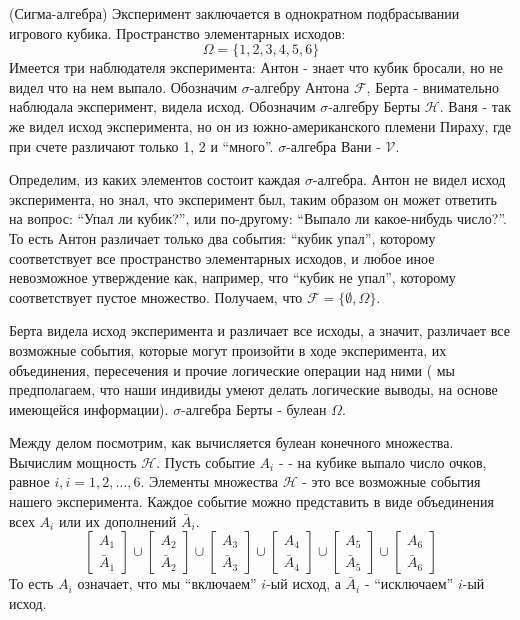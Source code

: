 \begin{exmp}(Сигма-алгебра)
	Эксперимент заключается в однократном подбрасывании игрового кубика. Пространство элементарных исходов:
	\[ \Omega = \{ 1, 2, 3, 4, 5, 6 \} \]
	Имеется три наблюдателя эксперимента: Антон - знает что кубик бросали, но не видел что на нем выпало. Обозначим $\sigma$-алгебру Антона $\mathcal{F}$, Берта - внимательно наблюдала эксперимент, видела исход. Обозначим $\sigma$-алгебру Берты $\mathcal{H}$. Ваня - так же видел исход эксперимента, но он из южно-американского племени Пираху, где при счете различают только 1, 2 и “много”. $\sigma$-алгебра Вани - $\mathcal{V}$.
	
	Определим, из каких элементов состоит каждая $\sigma$-алгебра. Антон не видел исход эксперимента, но знал, что эксперимент был, таким образом он может ответить на вопрос: “Упал ли кубик?”, или по-другому: “Выпало ли какое-нибудь число?”. То есть Антон различает только два события: “кубик упал”, которому соответствует все пространство элементарных исходов, и любое иное невозможное утверждение как, например, что “кубик не упал”, которому соответствует пустое множество. Получаем, что $\mathcal{F} = \{ \emptyset, \Omega \}$.
	
	Берта видела исход эксперимента и различает все исходы, а значит, различает все возможные события, которые могут произойти в ходе эксперимента, их объединения, пересечения и прочие логические операции над ними ( мы предполагаем, что наши индивиды умеют делать логические выводы, на основе имеющейся информации). $\sigma$-алгебра Берты - булеан $\Omega$.
	
	Между делом посмотрим, как вычисляется булеан конечного множества. Вычислим мощность $\mathcal{H}$. Пусть событие $A_i$ - - на кубике выпало число очков, равное $i, i=1,2,\dots,6$. Элементы множества $\mathcal{H}$ - это все возможные события нашего эксперимента. Каждое событие можно представить в виде объединения всех $A_i$ или их дополнений $\bar A_i$.
	\[
	\begin{bmatrix}
	A_1 \\ \bar A_1
	\end{bmatrix}
	\cup
	\begin{bmatrix}
	A_2 \\ \bar A_2
	\end{bmatrix}
	\cup
	\begin{bmatrix}
	A_3 \\ \bar A_3
	\end{bmatrix}
	\cup
	\begin{bmatrix}
	A_4 \\ \bar A_4
	\end{bmatrix}
	\cup
	\begin{bmatrix}
	A_5 \\ \bar A_5
	\end{bmatrix}
	\cup
	\begin{bmatrix}
	A_6 \\ \bar A_6
	\end{bmatrix}
	\]
	То есть $A_i$ означает, что мы “включаем” $i$-ый исход, а $\bar A_i$ - “исключаем” $i$-ый исход.
	

\end{exmp}
